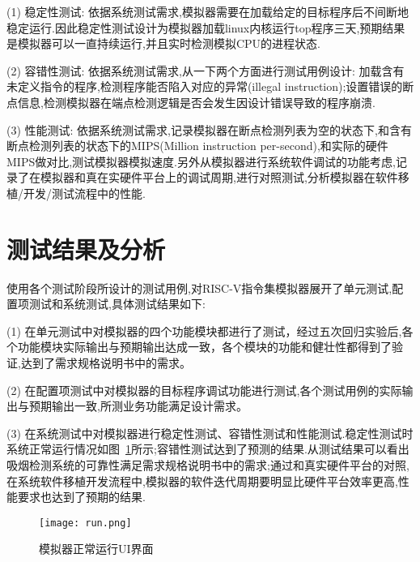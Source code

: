 (1)	稳定性测试: 依据系统测试需求,模拟器需要在加载给定的目标程序后不间断地稳定运行.因此稳定性测试设计为模拟器加载linux内核运行top程序三天,预期结果是模拟器可以一直持续运行,并且实时检测模拟CPU的进程状态.


(2)	容错性测试: 依据系统测试需求,从一下两个方面进行测试用例设计: 加载含有未定义指令的程序,检测程序能否陷入对应的异常(illegal instruction);设置错误的断点信息,检测模拟器在端点检测逻辑是否会发生因设计错误导致的程序崩溃.


(3)	性能测试: 依据系统测试需求,记录模拟器在断点检测列表为空的状态下,和含有断点检测列表的状态下的MIPS(Million instruction per-second),和实际的硬件MIPS做对比,测试模拟器模拟速度.另外从模拟器进行系统软件调试的功能考虑,记录了在模拟器和真在实硬件平台上的调试周期,进行对照测试,分析模拟器在软件移植/开发/测试流程中的性能.

\section{测试结果及分析}
使用各个测试阶段所设计的测试用例,对RISC-V指令集模拟器展开了单元测试,配置项测试和系统测试,具体测试结果如下:


(1) 在单元测试中对模拟器的四个功能模块都进行了测试，经过五次回归实验后,各个功能模块实际输出与预期输出达成一致，各个模块的功能和健壮性都得到了验证,达到了需求规格说明书中的需求。


(2) 在配置项测试中对模拟器的目标程序调试功能进行测试,各个测试用例的实际输出与预期输出一致,所测业务功能满足设计需求。


(3) 在系统测试中对模拟器进行稳定性测试、容错性测试和性能测试.稳定性测试时系统正常运行情况如图~\ref{fig:run}所示;容错性测试达到了预测的结果.从测试结果可以看出吸烟检测系统的可靠性满足需求规格说明书中的需求;通过和真实硬件平台的对照,在系统软件移植开发流程中,模拟器的软件迭代周期要明显比硬件平台效率更高,性能要求也达到了预期的结果. 
\begin{figure}[h]
  \centering
  \texttt{[image: run.png]}
  \caption{模拟器正常运行UI界面}
  \label{fig:run}
\end{figure}


